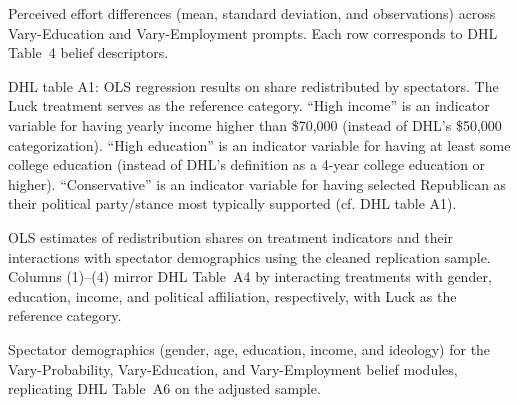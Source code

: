\documentclass[12pt,a4paper]{article}
\begin{document}
\begin{table}\footnotesize\centering

\caption{Perceived effort differences (mean, standard deviation, and observations) across Vary-Education and Vary-Employment prompts. Each row corresponds to DHL Table~4 belief descriptors.}
\label{tab:table4}
\end{table}

\begin{table}[ht!]\scriptsize\centering

\caption{DHL table A1: OLS regression results on share redistributed by spectators. The Luck treatment serves as the reference category. “High income” is an indicator variable for having yearly income higher than \$70,000 (instead of DHL's \$50,000 categorization). “High education” is an indicator variable for having at least some college education (instead of DHL's definition as a 4-year college education or higher). “Conservative” is an indicator variable for having selected Republican as their political party/stance most typically supported (cf. DHL table A1).}
\label{tableA1}
\end{table}

%
\begin{table}[ht!]\tiny\centering

\caption{OLS estimates of redistribution shares on treatment indicators and their interactions with spectator demographics using the cleaned replication sample. Columns (1)--(4) mirror DHL Table~A4 by interacting treatments with gender, education, income, and political affiliation, respectively, with Luck as the reference category.}
\label{tableA4}
\end{table}

\begin{table}[ht!]\scriptsize\centering

\caption{Spectator demographics (gender, age, education, income, and ideology) for the Vary-Probability, Vary-Education, and Vary-Employment belief modules, replicating DHL Table~A6 on the adjusted sample.}
\label{tab:tableA6}
\end{table}
\end{document}
